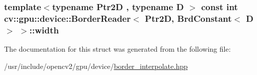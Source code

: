 \hypertarget{structcv_1_1gpu_1_1device_1_1BorderReader_3_01Ptr2D_00_01BrdConstant_3_01D_01_4_01_4_adaa6c102b0c3d4ec872f32fba9653244}{
\subsubsection[{width}]{\setlength{\rightskip}{0pt plus 5cm}template$<$typename Ptr2\-D , typename D $>$ const int {\bf cv\-::gpu\-::device\-::\-Border\-Reader}$<$ Ptr2\-D, {\bf Brd\-Constant}$<$ D $>$ $>$\-::width}}\label{structcv_1_1gpu_1_1device_1_1BorderReader_3_01Ptr2D_00_01BrdConstant_3_01D_01_4_01_4_adaa6c102b0c3d4ec872f32fba9653244}


The documentation for this struct was generated from the following file\-:\begin{DoxyCompactItemize}
\item 
/usr/include/opencv2/gpu/device/\hyperlink{border__interpolate_8hpp}{border\-\_\-interpolate.\-hpp}\end{DoxyCompactItemize}
